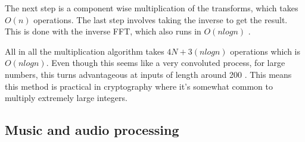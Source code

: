 The next step is a component wise multiplication of the transforms, which takes $O(n)$ operations. The last step involves taking the inverse to get the result. This is done with the inverse FFT, which also runs in $O(nlogn)$ \cite{Reducible2020}.

All in all the multiplication algorithm takes $4N + 3(nlogn)$ operations which is $O(nlogn)$. Even though this seems like a very convoluted process, for large numbers, this turns advantageous at inputs of length around 200 \cite{Emerencia2007}. This means this method is practical in cryptography where it's somewhat common to multiply extremely large integers.



\subsection{Music and audio processing}